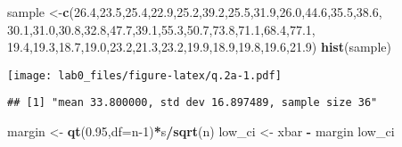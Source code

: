 \documentclass[
]{article}
\newenvironment{Shaded}{\begin{snugshade}}{\end{snugshade}}
\newcommand{\DataTypeTok}[1]{\textcolor[rgb]{0.13,0.29,0.53}{#1}}
\newcommand{\DecValTok}[1]{\textcolor[rgb]{0.00,0.00,0.81}{#1}}
\newcommand{\FloatTok}[1]{\textcolor[rgb]{0.00,0.00,0.81}{#1}}
\newcommand{\KeywordTok}[1]{\textcolor[rgb]{0.13,0.29,0.53}{\textbf{#1}}}
\newcommand{\NormalTok}[1]{#1}
\newcommand{\OperatorTok}[1]{\textcolor[rgb]{0.81,0.36,0.00}{\textbf{#1}}}
\newcommand{\StringTok}[1]{\textcolor[rgb]{0.31,0.60,0.02}{#1}}
\begin{document}
\begin{Shaded}
\begin{Highlighting}[]
\NormalTok{sample <-}\KeywordTok{c}\NormalTok{(}\FloatTok{26.4}\NormalTok{,}\FloatTok{23.5}\NormalTok{,}\FloatTok{25.4}\NormalTok{,}\FloatTok{22.9}\NormalTok{,}\FloatTok{25.2}\NormalTok{,}\FloatTok{39.2}\NormalTok{,}\FloatTok{25.5}\NormalTok{,}\FloatTok{31.9}\NormalTok{,}\FloatTok{26.0}\NormalTok{,}\FloatTok{44.6}\NormalTok{,}\FloatTok{35.5}\NormalTok{,}\FloatTok{38.6}\NormalTok{,}
           \FloatTok{30.1}\NormalTok{,}\FloatTok{31.0}\NormalTok{,}\FloatTok{30.8}\NormalTok{,}\FloatTok{32.8}\NormalTok{,}\FloatTok{47.7}\NormalTok{,}\FloatTok{39.1}\NormalTok{,}\FloatTok{55.3}\NormalTok{,}\FloatTok{50.7}\NormalTok{,}\FloatTok{73.8}\NormalTok{,}\FloatTok{71.1}\NormalTok{,}\FloatTok{68.4}\NormalTok{,}\FloatTok{77.1}\NormalTok{,}
           \FloatTok{19.4}\NormalTok{,}\FloatTok{19.3}\NormalTok{,}\FloatTok{18.7}\NormalTok{,}\FloatTok{19.0}\NormalTok{,}\FloatTok{23.2}\NormalTok{,}\FloatTok{21.3}\NormalTok{,}\FloatTok{23.2}\NormalTok{,}\FloatTok{19.9}\NormalTok{,}\FloatTok{18.9}\NormalTok{,}\FloatTok{19.8}\NormalTok{,}\FloatTok{19.6}\NormalTok{,}\FloatTok{21.9}\NormalTok{)}
\KeywordTok{hist}\NormalTok{(sample)}
\end{Highlighting}
\end{Shaded}

\texttt{[image: lab0\_files/figure-latex/q.2a-1.pdf]}

\begin{Shaded}
\end{Shaded}

\begin{verbatim}
## [1] "mean 33.800000, std dev 16.897489, sample size 36"
\end{verbatim}

\begin{Shaded}
\begin{Highlighting}[]
\NormalTok{margin <-}\StringTok{ }\KeywordTok{qt}\NormalTok{(}\FloatTok{0.95}\NormalTok{,}\DataTypeTok{df=}\NormalTok{n}\DecValTok{-1}\NormalTok{)}\OperatorTok{*}\NormalTok{s}\OperatorTok{/}\KeywordTok{sqrt}\NormalTok{(n)}
\NormalTok{low_ci <-}\StringTok{ }\NormalTok{xbar }\OperatorTok{-}\StringTok{ }\NormalTok{margin}
\NormalTok{low_ci}
\end{Highlighting}
\end{Shaded}
\end{document}
